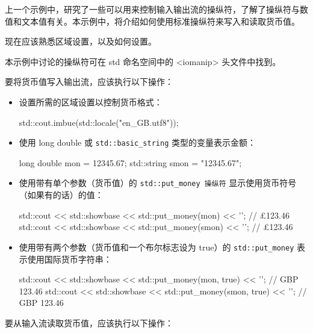 上一个示例中，研究了一些可以用来控制输入输出流的操纵符，了解了操纵符与数值和文本值有关。本示例中，将介绍如何使用标准操纵符来写入和读取货币值。


现在应该熟悉区域设置，以及如何设置。

本示例中讨论的操纵符可在 std 命名空间中的 <iomanip> 头文件中找到。


要将货币值写入输出流，应该执行以下操作：

\begin{itemize}
\item
设置所需的区域设置以控制货币格式：

\begin{cpp}
std::cout.imbue(std::locale("en_GB.utf8"));
\end{cpp}

\item
使用 long double 或 \verb|std::basic_string| 类型的变量表示金额：

\begin{cpp}
long double mon = 12345.67;
std::string smon = "12345.67";
\end{cpp}

\item
使用带有单个参数（货币值）的 \verb|std::put_money 操纵符| 显示使用货币符号（如果有的话）的值：

\begin{cpp}
std::cout << std::showbase << std::put_money(mon)
          << '\n'; // £123.46
std::cout << std::showbase << std::put_money(smon)
          << '\n'; // £123.46
\end{cpp}

\item
使用带有两个参数（货币值和一个布尔标志设为 true）的 \verb|std::put_money| 表示使用国际货币字符串：

\begin{cpp}
std::cout << std::showbase << std::put_money(mon, true)
          << '\n'; // GBP 123.46
std::cout << std::showbase << std::put_money(smon, true)
          << '\n'; // GBP 123.46
\end{cpp}
\end{itemize}

要从输入流读取货币值，应该执行以下操作：

